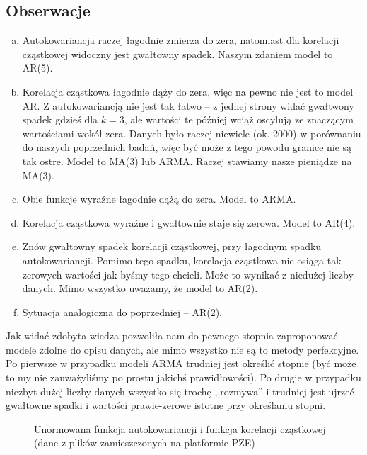 \documentclass[11pt, a4paper]{article}
\begin{document}
\subsection*{Obserwacje}
\begin{enumerate}[a)]
\item Autokowariancja raczej łagodnie zmierza do zera, natomiast dla korelacji cząstkowej widoczny jest gwałtowny spadek. Naszym zdaniem model to AR(5).
\item Korelacja cząstkowa łagodnie dąży do zera, więc na pewno nie jest to model AR. Z autokowariancją
nie jest tak łatwo -- z jednej strony widać gwałtwony spadek gdzieś dla $k = 3$, ale wartości te później
wciąż oscylują ze znaczącym wartościami wokół zera. Danych było raczej niewiele (ok. 2000) w porównaniu do naszych poprzednich badań, więc być może z tego powodu granice nie są tak ostre. Model to MA(3) lub ARMA.
Raczej stawiamy nasze pieniądze na MA(3).
\item Obie funkcje wyraźne łagodnie dążą do zera. Model to ARMA.
\item Korelacja cząstkowa wyraźne i gwałtownie staje się zerowa. Model to AR(4).
\item Znów gwałtowny spadek korelacji cząstkowej, przy łagodnym spadku autokowariancji. Pomimo tego spadku, korelacja cząstkowa nie osiąga tak zerowych wartości jak byśmy tego chcieli. Może to wynikać z niedużej
liczby danych. Mimo wszystko uważamy, że model to AR(2).
\item Sytuacja analogiczna do poprzedniej -- AR(2).
\end{enumerate}

Jak widać zdobyta wiedza pozwoliła nam do pewnego stopnia zaproponować modele zdolne do opisu danych,
ale mimo wszystko nie są to metody perfekcyjne. Po pierwsze w przypadku modeli ARMA trudniej jest określić stopnie (być może to my nie zauważyliśmy po prostu jakichś prawidłowości). Po drugie w przypadku niezbyt dużej liczby danych wszystko się trochę ,,rozmywa'' i trudniej jest ujrzeć gwałtowne spadki i wartości prawie-zerowe istotne przy określaniu stopni.

\begin{figure}[p!]
	\centering
	
	\hfill%
	
	\hfill%
	
	\hfill%
	
	\caption{Unormowana funkcja autokowariancji i funkcja korelacji cząstkowej (dane z plików zamieszczonych na platformie PZE)}
	\label{fig:zd6}
\end{figure}
\end{document}
